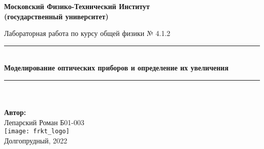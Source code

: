 \newcommand{\HRule}{\rule{\linewidth}{0.7mm}} %
	
	\begin{center}
		\large\textbf{Московский Физико-Технический Институт}\\ %
		\large\textbf{(государственный университет)}
	
		\vfill
		
		\Large Лабораторная работа по курсу общей физики № 4.1.2\\[0.5cm] %
		
		
		\HRule
		\\[0.4cm]
		{ \huge \bfseries Моделирование оптических приборов
		и определение их увеличения}%
		\\[0.4cm] 
		\HRule
		\\[0.5cm]
		
		\ \\
	\textbf{\large Автор:} \\	
	\large Лепарский Роман Б01-003\\ %
		\vfill
		\hspace*{-0.8 cm}\texttt{[image: frkt\_logo]}\\ %
		\large Долгопрудный, 2022 %
	\end{center}

\newpage
\setcounter{page}{2}
\fancyfoot[c]{\thepage}
\fancyhead[R]{}